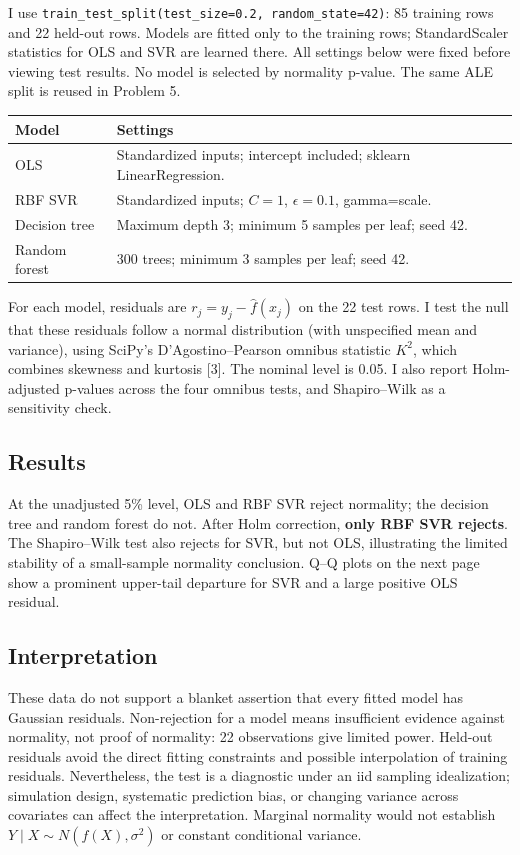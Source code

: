 \documentclass[10pt,letterpaper]{article}
\newcommand{\code}[1]{\texttt{#1}}
\begin{document}
I use \code{train\_test\_split(test\_size=0.2, random\_state=42)}:
85 training rows and 22 held-out rows. Models are fitted only to the training
rows; StandardScaler statistics for OLS and SVR are learned there. All settings
below were fixed before viewing test results. No model is selected by normality
p-value. The same ALE split is reused in Problem 5.

\begin{center}\small
\begin{tabular}{lp{4.7in}}
\toprule
Model & Settings \\
\midrule
OLS & Standardized inputs; intercept included; sklearn LinearRegression. \\
RBF SVR & Standardized inputs; $C=1$, $\epsilon=0.1$, gamma=scale. \\
Decision tree & Maximum depth 3; minimum 5 samples per leaf; seed 42. \\
Random forest & 300 trees; minimum 3 samples per leaf; seed 42. \\
\bottomrule
\end{tabular}
\end{center}

For each model, residuals are $r_j=y_j-\widehat f(x_j)$ on the 22 test rows.
I test the null that these residuals follow a normal distribution (with unspecified
mean and variance), using SciPy's D'Agostino--Pearson omnibus statistic
$K^2$, which combines skewness and kurtosis [3]. The nominal level is 0.05.
I also report Holm-adjusted p-values across the four omnibus tests, and
Shapiro--Wilk as a sensitivity check.

\subsection*{Results}
\begin{center}\small

\end{center}

At the unadjusted 5\% level, OLS and RBF SVR reject normality; the decision tree
and random forest do not. After Holm correction, \textbf{only RBF SVR rejects}.
The Shapiro--Wilk test also rejects for SVR, but not OLS, illustrating the
limited stability of a small-sample normality conclusion. Q--Q plots on the next
page show a prominent upper-tail departure for SVR and a large positive OLS
residual.

\subsection*{Interpretation}
These data do not support a blanket assertion that every fitted model has
Gaussian residuals. Non-rejection for a model means insufficient evidence against
normality, not proof of normality: 22 observations give limited power. Held-out
residuals avoid the direct fitting constraints and possible interpolation of
training residuals. Nevertheless, the test is a diagnostic under an iid sampling
idealization; simulation design, systematic prediction bias, or changing variance
across covariates can affect the interpretation. Marginal normality would not
establish $Y\mid X\sim N(f(X),\sigma^2)$ or constant conditional variance.
\end{document}
